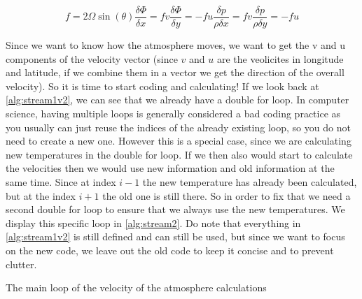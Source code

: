 \begin{subequations}
    \begin{equation}
        f = 2\Omega\sin(\theta)
        \label{eq:coriolis}
    \end{equation}
    \begin{equation}
        \frac{\delta \Phi}{\delta x} = fv
        \label{eq:pu simple}
    \end{equation}
    \begin{equation}
        \frac{\delta \Phi}{\delta y} = -fu
        \label{eq:pv simple}
    \end{equation}
    \begin{equation}
        \frac{\delta p}{\rho \delta x} = fv
        \label{eq:pu simple final}
    \end{equation}
    \begin{equation}
        \frac{\delta p}{\rho \delta y} = -fu
        \label{eq:pv simple final}
    \end{equation}
\end{subequations}

Since we want to know how the atmosphere moves, we want to get the v and u components of the velocity vector (since $v$ and $u$ are the veolicites in longitude and latitude, if we combine them 
in a vector we get the direction of the overall velocity). So it is time to start coding and calculating! If we look back at \autoref{alg:stream1v2}, we can see that we already have a double 
for loop. In computer science, having multiple loops is generally considered a bad coding practice as you usually can just reuse the indices of the already existing loop, so you do not need to 
create a new one. However this is a special case, since we are calculating new temperatures in the double for loop. If we then also would start to calculate the velocities then we would use new 
information and old information at the same time. Since at index $i - 1$ the new temperature has already been calculated, but at the index $i + 1$ the old one is still there. So in order to fix 
that we need a second double for loop to ensure that we always use the new temperatures. We display this specific loop in \autoref{alg:stream2}. Do note that everything in \autoref{alg:stream1v2} 
is still defined and can still be used, but since we want to focus on the new code, we leave out the old code to keep it concise and to prevent clutter. 

\begin{algorithm}[hbt]
    \SetAlgoLined
    \caption{The main loop of the velocity of the atmosphere calculations}
    \label{alg:stream2}
\end{algorithm}

